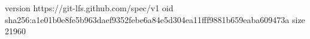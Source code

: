 version https://git-lfs.github.com/spec/v1
oid sha256:a1e01b0e8fe5b963daef9352febe6a84e5d304ea11fff9881b659eaba609473a
size 21960
